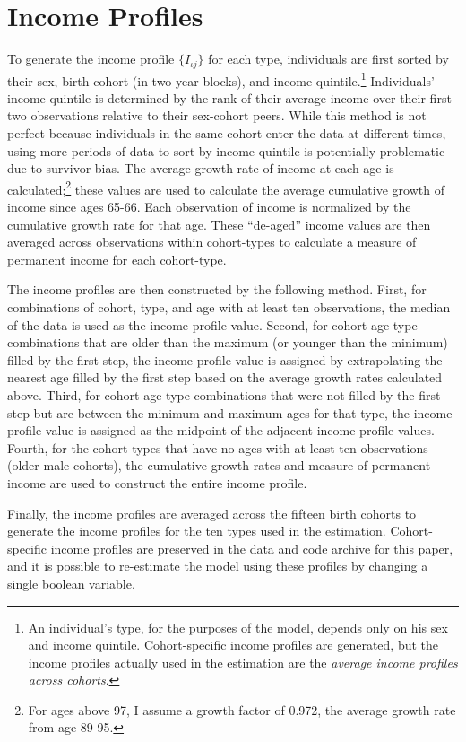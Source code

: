 \documentclass[12pt,pdftex,letterpaper]{article}
\newcommand{\Type}{\iota}
\newcommand{\Inc}{I}
\newcommand{\Age}{j}
\begin{document}
\section{Income Profiles}
\label{app:IncomeProfiles}

To generate the income profile $\{\Inc_{\Type \Age} \}$ for each type, individuals are first sorted by their sex, birth cohort (in two year blocks), and income quintile.\footnote{An individual's type, for the purposes of the model, depends only on his sex and income quintile.  Cohort-specific income profiles are generated, but the income profiles actually used in the estimation are the \textit{average income profiles across cohorts}.}  Individuals' income quintile is determined by the rank of their average income over their first two observations relative to their sex-cohort peers.  While this method is not perfect because individuals in the same cohort enter the data at different times, using more periods of data to sort by income quintile is potentially problematic due to survivor bias.  The average growth rate of income at each age is calculated;\footnote{For ages above 97, I assume a growth factor of 0.972, the average growth rate from age 89-95.} these values are used to calculate the average cumulative growth of income since ages 65-66.  Each observation of income is normalized by the cumulative growth rate for that age.  These ``de-aged'' income values are then averaged across observations within cohort-types to calculate a measure of permanent income for each cohort-type.

The income profiles are then constructed by the following method.  First, for combinations of cohort, type, and age with at least ten observations, the median of the data is used as the income profile value.  Second, for cohort-age-type combinations that are older than the maximum (or younger than the minimum) filled by the first step, the income profile value is assigned by extrapolating the nearest age filled by the first step based on the average growth rates calculated above.  Third, for cohort-age-type combinations that were not filled by the first step but are between the minimum and maximum ages for that type, the income profile value is assigned as the midpoint of the adjacent income profile values.  Fourth, for the cohort-types that have no ages with at least ten observations (older male cohorts), the cumulative growth rates and measure of permanent income are used to construct the entire income profile.

Finally, the income profiles are averaged across the fifteen birth cohorts to generate the income profiles for the ten types used in the estimation.  Cohort-specific income profiles are preserved in the data and code archive for this paper, and it is possible to re-estimate the model using these profiles by changing a single boolean variable.
\end{document}
